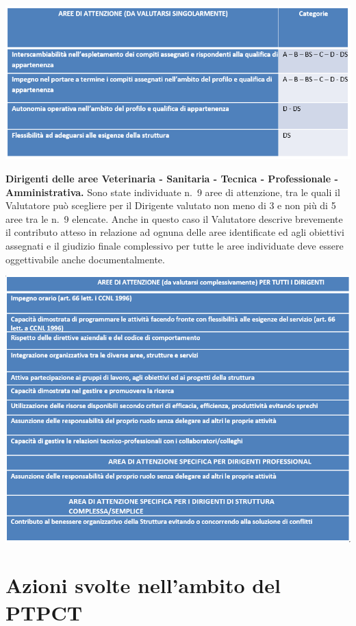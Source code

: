 \documentclass[
  12pt,
]{article}
\begin{document}
\begin{center}\includegraphics[width=0.9\linewidth]{figure/f4} \end{center}

\textbf{Dirigenti delle aree Veterinaria - Sanitaria - Tecnica -
Professionale - Amministrativa.} Sono state individuate n.~9 aree di
attenzione, tra le quali il Valutatore può scegliere per il Dirigente
valutato non meno di 3 e non più di 5 aree tra le n.~9 elencate. Anche
in questo caso il Valutatore descrive brevemente il contributo atteso in
relazione ad ognuna delle aree identificate ed agli obiettivi assegnati
e il giudizio finale complessivo per tutte le aree individuate deve
essere oggettivabile anche documentalmente.

\begin{center}\includegraphics[width=0.9\linewidth]{figure/f5} \end{center}

\hypertarget{azioni-svolte-nellambito-del-ptpct}{%
\section{Azioni svolte nell'ambito del
PTPCT}\label{azioni-svolte-nellambito-del-ptpct}}
\end{document}
